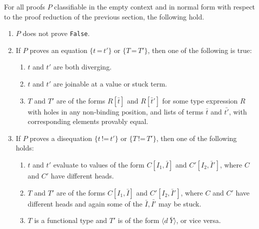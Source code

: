 \documentclass{fundam}
\newcommand{\Eq}[0]{\texttt{=}}
\newcommand{\Neq}[0]{\texttt{!=}}
\begin{document}
\begin{theorem}[Consistency]
\label{thm:consistency}
For all proofs $P$ classifiable in the empty context and in normal
form with respect to the proof reduction of the previous section, the
following hold.

\begin{enumerate}
\item $P$ does not
prove \texttt{False}.  
\item If $P$ proves an equation $\{t\, \Eq\,
t'\}$ or $\{T\,\Eq\, T'\}$, then one of the following is true:

\begin{enumerate}
\item $t$ and $t'$ are both diverging.

\item $t$ and $t'$ are joinable at a value or stuck term.

\item $T$ and $T'$ are of the forms $R[\bar{t}]$ and $R[\bar{t}']$ for
some type expression $R$ with holes in any non-binding position, and
lists of terms $\bar{t}$ and $\bar{t'}$, with corresponding elements
provably equal.
\end{enumerate}

\item If $P$ proves a disequation $\{t\, \Neq\, t'\}$ or $\{T\,\Neq\,
T'\}$, then one of the following holds:

\begin{enumerate}
\item $t$ and $t'$ evaluate to values of the form
$C[I_1,\bar{I}]$ and $C'[I_2,\bar{I}']$, where $C$ and $C'$ have
different heads.

\item $T$ and $T'$ are of the forms $C[I_1,\bar{I}]$ and
$C'[I_2,\bar{I}']$, where $C$ and $C'$ have different heads and
again some of the $\bar{I},\bar{I'}$ may be stuck.

\item $T$ is a functional type and $T'$ is of the form $\langle d\
\bar{Y}\rangle$, or vice versa.
\end{enumerate}
\end{enumerate}
\end{theorem}
\end{document}
